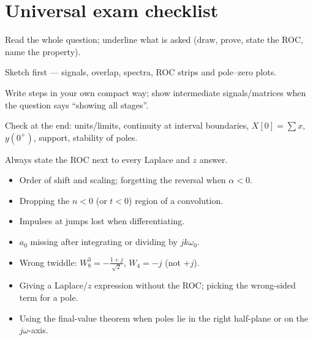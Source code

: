 \section{Universal exam checklist}
\begin{method}
\begin{steps}
\item Read the whole question; underline what is asked (draw, prove, state the ROC, name the property).
\item Sketch first --- signals, overlap, spectra, ROC strips and pole--zero plots.
\item Write steps in your own compact way; show intermediate signals/matrices when the question says ``showing all stages''.
\item Check at the end: units/limits, continuity at interval boundaries, $X[0]=\sum x$, $y(0^+)$, support, stability of poles.
\item Always state the ROC next to every Laplace and $z$ answer.
\end{steps}
\end{method}
\begin{pitfall}
\begin{itemize}[leftmargin=1.4em,itemsep=1pt]
\item Order of shift and scaling; forgetting the reversal when $\alpha<0$.
\item Dropping the $n<0$ (or $t<0$) region of a convolution.
\item Impulses at jumps lost when differentiating.
\item $a_0$ missing after integrating or dividing by $jk\omega_0$.
\item Wrong twiddle: $W_8^3=-\frac{1+j}{\sqrt2}$, $W_4=-j$ (not $+j$).
\item Giving a Laplace/$z$ expression without the ROC; picking the wrong-sided term for a pole.
\item Using the final-value theorem when poles lie in the right half-plane or on the $j\omega$-axis.
\end{itemize}
\end{pitfall}

